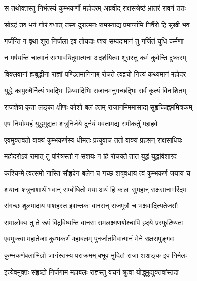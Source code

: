 
\twolineshloka
{स तथोक्तस्तु निर्भर्त्स्य कुम्भकर्णो महोदरम्}
{अब्रवीद् राक्षसश्रेष्ठं भ्रातरं रावणं ततः} %

\twolineshloka
{सोऽहं तव भयं घोरं वधात् तस्य दुरात्मनः}
{रामस्याद्य प्रमार्जामि निर्वैरो हि सुखी भव} %

\twolineshloka
{गर्जन्ति न वृथा शूरा निर्जला इव तोयदाः}
{पश्य सम्पद्यमानं तु गर्जितं युधि कर्मणा} %

\twolineshloka
{न मर्षयन्ति चात्मानं सम्भावयितुमात्मना}
{अदर्शयित्वा शूरास्तु कर्म कुर्वन्ति दुष्करम्} %

\twolineshloka
{विक्लवानां ह्यबुद्धीनां राज्ञां पण्डितमानिनाम्}
{रोचते त्वद्वचो नित्यं कथ्यमानं महोदर} %

\twolineshloka
{युद्धे कापुरुषैर्नित्यं भवद्भिः प्रियवादिभिः}
{राजानमनुगच्छद्भिः सर्वं कृत्यं विनाशितम्} %

\twolineshloka
{राजशेषा कृता लङ्का क्षीणः कोशो बलं हतम्}
{राजानमिममासाद्य सुहृच्चिह्नममित्रकम्} %

\twolineshloka
{एष निर्याम्यहं युद्धमुद्यतः शत्रुनिर्जये}
{दुर्नयं भवतामद्य समीकर्तुं महाहवे} %

\twolineshloka
{एवमुक्तवतो वाक्यं कुम्भकर्णस्य धीमतः}
{प्रत्युवाच ततो वाक्यं प्रहसन् राक्षसाधिपः} %

\twolineshloka
{महोदरोऽयं रामात् तु परित्रस्तो न संशयः}
{न हि रोचयते तात युद्धं युद्धविशारद} %

\twolineshloka
{कश्चिन्मे त्वत्समो नास्ति सौहृदेन बलेन च}
{गच्छ शत्रुवधाय त्वं कुम्भकर्ण जयाय च} %

\twolineshloka
{शयानः शत्रुनाशार्थं भवान् सम्बोधितो मया}
{अयं हि कालः सुमहान् राक्षसानामरिंदम} %

\twolineshloka
{संगच्छ शूलमादाय पाशहस्त इवान्तकः}
{वानरान् राजपुत्रौ च भक्षयादित्यतेजसौ} %

\twolineshloka
{समालोक्य तु ते रूपं विद्रविष्यन्ति वानराः}
{रामलक्ष्मणयोश्चापि हृदये प्रस्फुटिष्यतः} %

\twolineshloka
{एवमुक्त्वा महातेजाः कुम्भकर्णं महाबलम्}
{पुनर्जातमिवात्मानं मेने राक्षसपुङ्गवः} %

\twolineshloka
{कुम्भकर्णबलाभिज्ञो जानंस्तस्य पराक्रमम्}
{बभूव मुदितो राजा शशाङ्क इव निर्मलः} %

\twolineshloka
{इत्येवमुक्तः संहृष्टो निर्जगाम महाबलः}
{राज्ञस्तु वचनं श्रुत्वा योद्धुमुद्युक्तवांस्तदा} %

